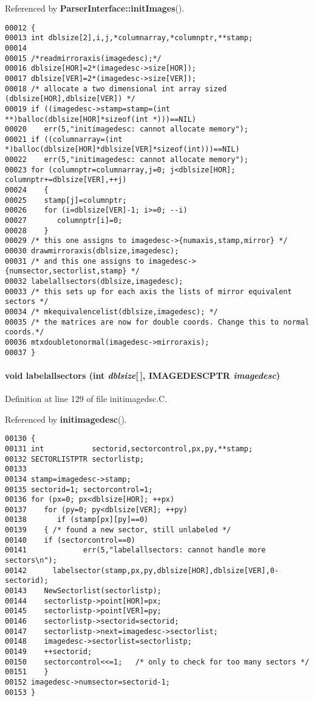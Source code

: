 Referenced by {\bf Parser\-Interface::init\-Images}().\small\begin{verbatim}00012 {
00013 int dblsize[2],i,j,*columnarray,*columnptr,**stamp;
00014 
00015 /*readmirroraxis(imagedesc);*/
00016 dblsize[HOR]=2*(imagedesc->size[HOR]);
00017 dblsize[VER]=2*(imagedesc->size[VER]);
00018 /* allocate a two dimensional int array sized (dblsize[HOR],dblsize[VER]) */
00019 if ((imagedesc->stamp=stamp=(int **)balloc(dblsize[HOR]*sizeof(int *)))==NIL)
00020    err(5,"initimagedesc: cannot allocate memory");
00021 if ((columnarray=(int *)balloc(dblsize[HOR]*dblsize[VER]*sizeof(int)))==NIL)
00022    err(5,"initimagedesc: cannot allocate memory");
00023 for (columnptr=columnarray,j=0; j<dblsize[HOR]; columnptr+=dblsize[VER],++j)
00024    {
00025    stamp[j]=columnptr;
00026    for (i=dblsize[VER]-1; i>=0; --i)
00027       columnptr[i]=0;
00028    }
00029 /* this one assigns to imagedesc->{numaxis,stamp,mirror} */
00030 drawmirroraxis(dblsize,imagedesc);
00031 /* and this one assigns to imagedesc->{numsector,sectorlist,stamp} */
00032 labelallsectors(dblsize,imagedesc);
00033 /* this sets up for each axis the lists of mirror equivalent sectors */
00034 /* mkequivalencelist(dblsize,imagedesc); */
00035 /* the matrices are now for double coords. Change this to normal coords.*/
00036 mtxdoubletonormal(imagedesc->mirroraxis);
00037 }
\end{verbatim}\normalsize 
\label{initimagedsc.C_a3}
\paragraph{\setlength{\rightskip}{0pt plus 5cm}void labelallsectors (int {\em dblsize}[$\,$], {\bf IMAGEDESCPTR} {\em imagedesc})}\hfill



Definition at line 129 of file initimagedsc.C.

Referenced by {\bf initimagedesc}().\small\begin{verbatim}00130 {
00131 int           sectorid,sectorcontrol,px,py,**stamp;
00132 SECTORLISTPTR sectorlistp;
00133 
00134 stamp=imagedesc->stamp;
00135 sectorid=1; sectorcontrol=1;
00136 for (px=0; px<dblsize[HOR]; ++px)
00137    for (py=0; py<dblsize[VER]; ++py)
00138       if (stamp[px][py]==0)
00139    { /* found a new sector, still unlabeled */
00140    if (sectorcontrol==0)
00141             err(5,"labelallsectors: cannot handle more sectors\n");
00142      labelsector(stamp,px,py,dblsize[HOR],dblsize[VER],0-sectorid);
00143    NewSectorlist(sectorlistp);
00144    sectorlistp->point[HOR]=px;
00145    sectorlistp->point[VER]=py;
00146    sectorlistp->sectorid=sectorid;
00147    sectorlistp->next=imagedesc->sectorlist;
00148    imagedesc->sectorlist=sectorlistp;
00149    ++sectorid;
00150    sectorcontrol<<=1;   /* only to check for too many sectors */
00151    }
00152 imagedesc->numsector=sectorid-1;
00153 }
\end{verbatim}\normalsize 
\label{initimagedsc.C_a5}
